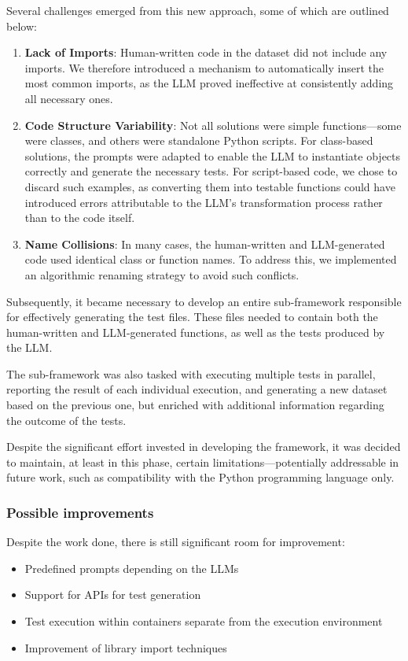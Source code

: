 Several challenges emerged from this new approach, some 
of which are outlined below:

\begin{enumerate}
    \item \textbf{Lack of Imports}: Human-written code in 
    the dataset did not include any imports. We therefore 
    introduced a mechanism to automatically insert the most 
    common imports, as the LLM proved ineffective at 
    consistently adding all necessary ones.
    
    \item \textbf{Code Structure Variability}: Not all 
    solutions were simple functions—some were classes, 
    and others were standalone Python scripts. For 
    class-based solutions, the prompts were adapted to 
    enable the LLM to instantiate objects correctly and 
    generate the necessary tests. For script-based code, 
    we chose to discard such examples, as converting 
    them into testable functions could have introduced 
    errors attributable to the LLM's transformation 
    process rather than to the code itself.
    
    \item \textbf{Name Collisions}: In many cases, 
    the human-written and LLM-generated code used 
    identical class or function names. To address this, 
    we implemented an algorithmic renaming strategy to 
    avoid such conflicts.
\end{enumerate}

Subsequently, it became necessary to develop an 
entire sub-framework responsible for effectively 
generating the test files. These files needed to 
contain both the human-written and LLM-generated 
functions, as well as the tests produced by the LLM.

The sub-framework was also tasked with executing 
multiple tests in parallel, reporting the result of 
each individual execution, and generating a new dataset 
based on the previous one, but enriched with additional 
information regarding the outcome of the tests.

Despite the significant effort invested in 
developing the framework, it was decided to maintain, 
at least in this phase, certain limitations—potentially 
addressable in future work, such as compatibility with the 
Python programming language only.

\subsubsection{Possible improvements}
Despite the work done, there is still significant room for improvement:
\begin{itemize}
\item Predefined prompts depending on the LLMs
\item Support for APIs for test generation
\item Test execution within containers separate from the execution environment
\item Improvement of library import techniques
\end{itemize}